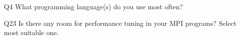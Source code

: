 \begin{description}%
\item{Q4} What programming language(s) do you use most often?%
\item{Q23} Is there any room for performance tuning in your MPI programs? Select most suitable one.%
\end{description}%
